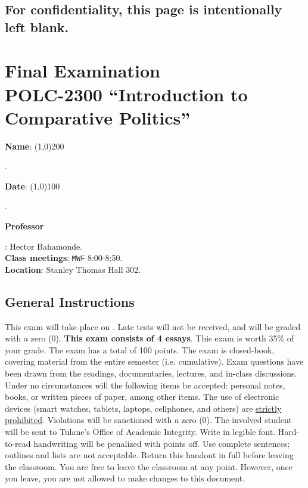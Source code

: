 \documentclass{article}
\begin{document}
\subsection*{For confidentiality, this page is intentionally left blank.}
\clearpage
\newpage


{\centering\section*{Final Examination\\POLC-2300 ``Introduction to Comparative Politics''}}

{\vspace{.5cm}\raggedright{\bf Name}: \line(1,0){200}}. %
{\vspace{.5cm}\hspace{4.5cm}\raggedright{\bf Date}: \line(1,0){100}}. %


{\vspace{.5cm}\raggedright \bf Professor}: Hector Bahamonde.\\
{\bf Class meetings}: \texttt{MWF} 8:00-8:50.\\
{\bf Location}: Stanley Thomas Hall 302.


\vspace{0.5cm}\subsection*{General Instructions}

This exam will take place on {\bf {\unskip}}. Late tests will not be received, and will be graded with a zero (0). {\bf This exam consists of 4 essays}. This exam is worth 35\% of your grade. The exam has a total of 100 points. The exam is closed-book, covering material from the entire semester (i.e. cumulative). Exam questions have been drawn from the readings, documentaries, lectures, and in-class discussions. Under no circumstances will the following items be accepted: personal notes, books, or written pieces of paper, among other items. The use of electronic devices (smart watches, tablets, laptops, cellphones, and others) are \underline{strictly prohibited}. Violations will be sanctioned with a zero (0). The involved student will be sent to Tulane's Office of Academic Integrity. Write in legible font.  Hard-to-read handwriting will be penalized with points off. Use complete sentences; outlines and lists are not acceptable. Return this handout in full before leaving the classroom. You are free to leave the classroom at any point. However, once you leave, you are not allowed to make changes to this document.
\clearpage
\newpage
\end{document}
